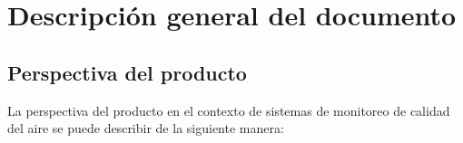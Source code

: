 \documentclass[
11pt, %
codirector, %
]{charter}
\begin{document}
\section{Descripción general del documento}
\label{sec:orgc1c4017}




\subsection{Perspectiva del producto}
\label{sec:org24980a8}


La perspectiva del producto en el contexto de sistemas de monitoreo de calidad del aire se puede describir de la siguiente manera:
\end{document}
